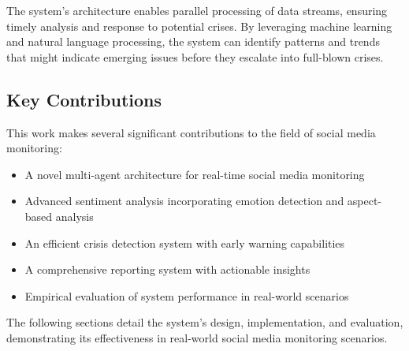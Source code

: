 The system's architecture enables parallel processing of data streams, ensuring timely analysis and response to potential crises. By leveraging machine learning and natural language processing, the system can identify patterns and trends that might indicate emerging issues before they escalate into full-blown crises.

\subsection{Key Contributions}
This work makes several significant contributions to the field of social media monitoring:
\begin{itemize}
    \item A novel multi-agent architecture for real-time social media monitoring
    \item Advanced sentiment analysis incorporating emotion detection and aspect-based analysis
    \item An efficient crisis detection system with early warning capabilities
    \item A comprehensive reporting system with actionable insights
    \item Empirical evaluation of system performance in real-world scenarios
\end{itemize}

The following sections detail the system's design, implementation, and evaluation, demonstrating its effectiveness in real-world social media monitoring scenarios. 